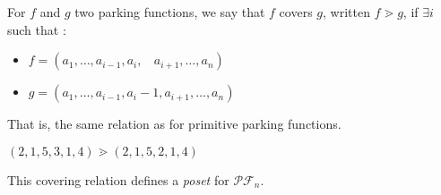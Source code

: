 \begin{definition}[$\gtrdot$]
    For $f$ and $g$ two parking functions, we say
    that $f$ covers $g$, written $f \gtrdot g$, if
    $\exists i$ such that :
    \begin{itemize}
        \item $f = (a_1, \ldots, a_{i-1}, a_i,\ \ \ \ 
            a_{i+1}, \ldots, a_n)$
        \item $g = (a_1, \ldots, a_{i-1}, a_i - 1, a_{i+1},
        \ldots, a_n)$
    \end{itemize}
    That is, the same relation as for primitive
    parking functions.
\end{definition}

\begin{example}[$n = 6$]
    $(2, 1, 5, 3, 1, 4) \gtrdot (2, 1, 5, 2, 1, 4)$    
\end{example}

\begin{prop}
    This covering relation defines a \emph{poset}
    for $\mathcal{PF}_n$.
\end{prop}

